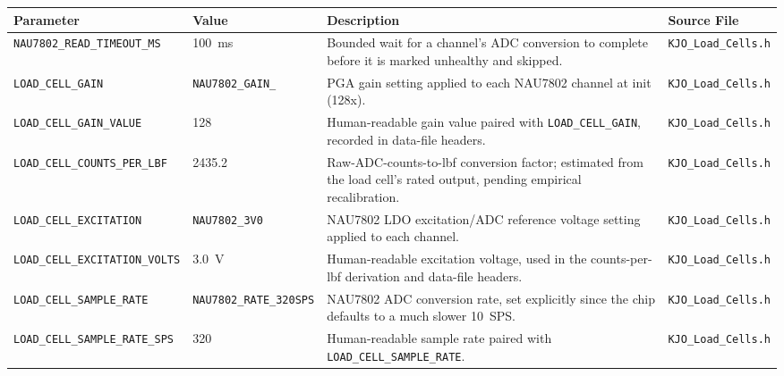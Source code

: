 ﻿\documentclass[11pt,letterpaper]{article}
\begin{document}
\begingroup
\footnotesize
\begin{longtable}{@{}p{3.2cm}p{2.4cm}p{6.2cm}p{2.6cm}@{}}
\toprule
Parameter & Value & Description & Source File \\
\midrule
\texttt{NAU7802\_\allowbreak READ\_\allowbreak TIMEOUT\_\allowbreak MS} & 100~ms & Bounded wait for a channel's ADC conversion to complete before it is marked unhealthy and skipped. & \texttt{KJO\_\allowbreak Load\_\allowbreak Cells.h} \\
\texttt{LOAD\_\allowbreak CELL\_\allowbreak GAIN} & \texttt{NAU7802\_\allowbreak GAIN\_\allowbreak 128} & PGA gain setting applied to each NAU7802 channel at init (128x). & \texttt{KJO\_\allowbreak Load\_\allowbreak Cells.h} \\
\texttt{LOAD\_\allowbreak CELL\_\allowbreak GAIN\_\allowbreak VALUE} & 128 & Human-readable gain value paired with \texttt{LOAD\_\allowbreak CELL\_\allowbreak GAIN}, recorded in data-file headers. & \texttt{KJO\_\allowbreak Load\_\allowbreak Cells.h} \\
\texttt{LOAD\_\allowbreak CELL\_\allowbreak COUNTS\_\allowbreak PER\_\allowbreak LBF} & 2435.2 & Raw-ADC-counts-to-lbf conversion factor; estimated from the load cell's rated output, pending empirical recalibration. & \texttt{KJO\_\allowbreak Load\_\allowbreak Cells.h} \\
\texttt{LOAD\_\allowbreak CELL\_\allowbreak EXCITATION} & \texttt{NAU7802\_\allowbreak 3V0} & NAU7802 LDO excitation/ADC reference voltage setting applied to each channel. & \texttt{KJO\_\allowbreak Load\_\allowbreak Cells.h} \\
\texttt{LOAD\_\allowbreak CELL\_\allowbreak EXCITATION\_\allowbreak VOLTS} & 3.0~V & Human-readable excitation voltage, used in the counts-per-lbf derivation and data-file headers. & \texttt{KJO\_\allowbreak Load\_\allowbreak Cells.h} \\
\texttt{LOAD\_\allowbreak CELL\_\allowbreak SAMPLE\_\allowbreak RATE} & \texttt{NAU7802\_\allowbreak RATE\_\allowbreak 320SPS} & NAU7802 ADC conversion rate, set explicitly since the chip defaults to a much slower 10~SPS. & \texttt{KJO\_\allowbreak Load\_\allowbreak Cells.h} \\
\texttt{LOAD\_\allowbreak CELL\_\allowbreak SAMPLE\_\allowbreak RATE\_\allowbreak SPS} & 320 & Human-readable sample rate paired with \texttt{LOAD\_\allowbreak CELL\_\allowbreak SAMPLE\_\allowbreak RATE}. & \texttt{KJO\_\allowbreak Load\_\allowbreak Cells.h} \\
\end{longtable}
\endgroup
\end{document}
